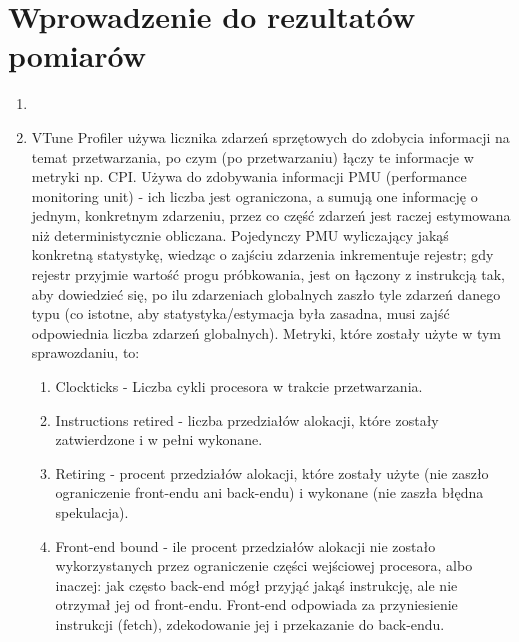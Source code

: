 \documentclass[12pt]{article}
\begin{document}
\section {Wprowadzenie do rezultatów pomiarów}
\begin{enumerate}
	\item 
	\item VTune Profiler używa licznika zdarzeń sprzętowych do zdobycia informacji na temat przetwarzania, po czym (po przetwarzaniu) łączy te informacje w metryki np. CPI. Używa do zdobywania informacji PMU (performance monitoring unit) - ich liczba jest ograniczona, a sumują one informację o jednym, konkretnym zdarzeniu, przez co część zdarzeń jest raczej estymowana niż deterministycznie obliczana. Pojedynczy PMU wyliczający jakąś konkretną statystykę, wiedząc o zajściu zdarzenia inkrementuje rejestr; gdy rejestr przyjmie wartość progu próbkowania, jest on łączony z instrukcją tak, aby dowiedzieć się, po ilu zdarzeniach globalnych zaszło tyle zdarzeń danego typu (co istotne, aby statystyka/estymacja była zasadna, musi zajść odpowiednia liczba zdarzeń globalnych). Metryki, które zostały użyte w tym sprawozdaniu, to: 
	
	\begin{enumerate}
		\item Clockticks - Liczba cykli procesora w trakcie przetwarzania.
		\item Instructions retired - liczba przedziałów alokacji, które zostały zatwierdzone i w pełni wykonane.
		\item Retiring - procent przedziałów alokacji, które zostały użyte (nie zaszło ograniczenie front-endu ani back-endu) i wykonane (nie zaszła błędna spekulacja).
		
		\item Front-end bound - ile procent przedziałów alokacji nie zostało wykorzystanych przez ograniczenie części wejściowej procesora, albo inaczej: jak często back-end mógł przyjąć jakąś instrukcję, ale nie otrzymał jej od front-endu. Front-end odpowiada za przyniesienie instrukcji (fetch), zdekodowanie jej i przekazanie do back-endu.
		

\end{enumerate}
\end{enumerate}
\end{document}
